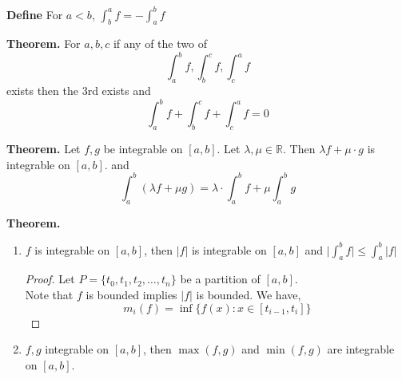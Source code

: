 \documentclass[10pt,letterpaper]{article}
\begin{document}
	\textbf{Define } 
		For $a < b$, $\displaystyle\int_{b}^{a} f = - \displaystyle\int_{a}^{b} f$
 	
 	
 	\textbf{Theorem. } For $a, b, c$ if any of the two of
 	$$\displaystyle\int_{a}^{b} f, \displaystyle\int_{b}^{c} f, \displaystyle\int_{c}^{a} f$$
 	exists then the 3rd exists and 
 	$$\displaystyle\int_{a}^{b}f + \displaystyle\int_{b}^{c}f + \displaystyle\int_{c}^{a} f = 0$$
 	
 	\textbf{Theorem. } Let $f, g$ be integrable on $[a, b]$. Let $\lambda, \mu \in \mathbb{R}$.
 	Then $\lambda f + \mu \cdot g$ is integrable on $[a, b]$.
 	and 
 	$$\displaystyle\int_{a}^{b} (\lambda f + \mu g) = \lambda \cdot \displaystyle\int_{a}^{b} f 
 	+ \mu \displaystyle\int_{a}^{b} g$$
 	
 	\textbf{Theorem. } 
 	\begin{enumerate}[(1)]
 	\item $f$ is integrable on $[a, b]$, then $|f|$ is integrable on $[a, b]$ 
 	and $\bigg| \displaystyle\int_{a}^{b} f \bigg| \leq \displaystyle\int_{a}^{b} |f|$
	\begin{proof}
		Let $P = \{t_0, t_1, t_2, \ldots, t_n\}$ be a partition of $[a, b]$. \\
		Note that $f$ is bounded implies $|f|$ is bounded. We have,
		$$m_i(f) = \inf\{f(x) : x \in [t_{i-1}, t_i]\}$$
			
	\end{proof}
	
		 	
 	\item $f, g$ integrable on $[a, b]$, then
 	$\max(f, g)$ and $\min(f, g)$ are integrable on $[a, b]$.
 	\end{enumerate}
\end{document}
